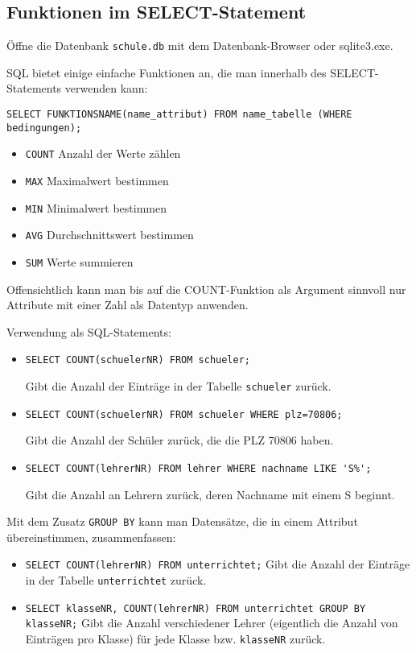 \subsection[Funktionen]{Funktionen im SELECT-Statement}\label{funktionen}
Öffne die Datenbank \texttt{schule.db} mit dem Datenbank-Browser oder sqlite3.exe.

SQL bietet einige einfache Funktionen an, die man innerhalb des SELECT-Statements verwenden kann:
\begin{tcolorbox}[title=Funktionen in SQL]
	\lstinline!SELECT FUNKTIONSNAME(name_attribut) FROM name_tabelle (WHERE bedingungen);!
\end{tcolorbox}
\begin{itemize}
	\item \lstinline!COUNT!	Anzahl der Werte zählen
	\item \lstinline!MAX!	Maximalwert bestimmen
	\item \lstinline!MIN!	Minimalwert bestimmen
	\item \lstinline!AVG!	Durchschnittswert bestimmen
	\item \lstinline!SUM!	Werte summieren
\end{itemize}

Offensichtlich kann man bis auf die COUNT-Funktion als Argument sinnvoll nur Attribute mit einer Zahl als Datentyp anwenden.

Verwendung als SQL-Statements:
\begin{itemize}
	\item \lstinline!SELECT COUNT(schuelerNR) FROM schueler;!

	Gibt die Anzahl der Einträge in der Tabelle \lstinline!schueler! zurück.
	\item \lstinline!SELECT COUNT(schuelerNR) FROM schueler WHERE plz=70806;!

	Gibt die Anzahl der Schüler zurück, die die PLZ 70806 haben.
	\item \lstinline!SELECT COUNT(lehrerNR) FROM lehrer WHERE nachname LIKE 'S%';!

	Gibt die Anzahl an Lehrern zurück, deren Nachname mit einem S beginnt.
\end{itemize}
Mit dem Zusatz \lstinline!GROUP BY! kann man Datensätze, die in einem Attribut übereinstimmen, zusammenfassen:
\begin{itemize}
	\item \lstinline!SELECT COUNT(lehrerNR) FROM unterrichtet;!
	Gibt die Anzahl der Einträge in der Tabelle \lstinline!unterrichtet! zurück.
	\item \lstinline!SELECT klasseNR, COUNT(lehrerNR) FROM unterrichtet GROUP BY klasseNR;!
	Gibt die Anzahl verschiedener Lehrer (eigentlich die Anzahl von Einträgen pro Klasse) für jede Klasse bzw. \lstinline!klasseNR! zurück.
\end{itemize}

